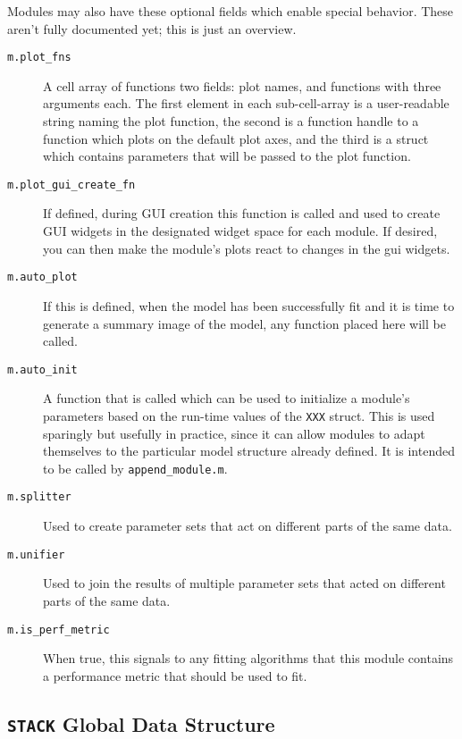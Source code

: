 \documentclass[letterpaper]{report}
\newcommand{\matlab}[1]{\texttt{#1}}
\begin{document}
Modules may also have these optional fields which enable special behavior. These aren't fully documented yet; this is just an overview.

\begin{description}

\item [\matlab{m.plot\_fns}] A cell array of functions two fields: plot names, and functions with three arguments each. The first element in each sub-cell-array is a user-readable string naming the plot function, the second is a function handle to a function which plots on the default plot axes, and the third is a struct which contains parameters that will be passed to the plot function.  

\item [\matlab{m.plot\_gui\_create\_fn}] If defined, during GUI creation this function is called and used to create GUI widgets in the designated widget space for each module. If desired, you can then make the module's plots react to changes in the gui widgets. 

\item [\matlab{m.auto\_plot}] If this is defined, when the model has been successfully fit and it is time to generate a summary image of the model, any function placed here will be called.

\item [\matlab{m.auto\_init}] A function that is called which can be used to initialize a module's parameters based on the run-time values of the \matlab{XXX} struct. This is used sparingly but usefully in practice, since it can allow modules to adapt themselves to the particular model structure already defined. It is intended to be called by \matlab{append\_module.m}. 

\item [\matlab{m.splitter}] Used to create parameter sets that act on different parts of the same data. 

\item [\matlab{m.unifier}] Used to join the results of multiple parameter sets that acted on different parts of the same data. 

\item [\matlab{m.is\_perf\_metric}] When true, this signals to any fitting algorithms that this module contains a performance metric that should be used to fit. 

\end{description}


\subsection{\matlab{STACK} Global Data Structure}
\end{document}
